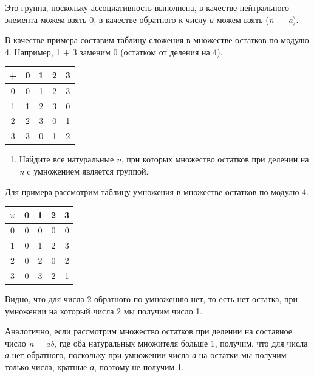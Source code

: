 \documentclass[12pt]{article}
\begin{document}
    Это группа, поскольку ассоциативность выполнена, в качестве нейтрального
    элемента можем взять 0, в качестве обратного к числу \emph{а} можем
    взять (\emph{n --- a}).

    В качестве примера составим таблицу сложения в множестве остатков по
    модулю 4. Например, 1 + 3 заменим 0 (остатком от деления на 4).

    \begin{tabular}{|c|c|c|c|c|}
        \hline
        + & 0 & 1 & 2 & 3 \\
        \hline
        0 & 0 & 1 & 2 & 3 \\
        \hline
        1 & 1 & 2 & 3 & 0 \\
        \hline
        2 & 2 & 3 & 0 & 1 \\
        \hline
        3 & 3 & 0 & 1 & 2 \\
        \hline
    \end{tabular}

    \begin{enumerate}
        \def\labelenumi{\arabic{enumi}.}
        \item
              Найдите все натуральные \emph{n}, при которых множество остатков при
              делении на \emph{n} c умножением является группой.
    \end{enumerate}

    Для примера рассмотрим таблицу умножения в множестве остатков по модулю
    4.

    \begin{tabular}{|c|c|c|c|c|}
        \hline
        $\times$ & 0 & 1 & 2 & 3 \\
        \hline
        0        & 0 & 0 & 0 & 0 \\
        \hline
        1        & 0 & 1 & 2 & 3 \\
        \hline
        2        & 0 & 2 & 0 & 2 \\
        \hline
        3        & 0 & 3 & 2 & 1 \\
        \hline
    \end{tabular}

    Видно, что для числа 2 обратного по умножению нет, то есть нет остатка,
    при умножении на который числа 2 мы получим число 1.

    Аналогично, если рассмотрим множество остатков при делении на составное
    число \emph{n} = \emph{ab}, где оба натуральных множителя больше 1,
    получим, что для числа \emph{а} нет обратного, поскольку при умножении
    числа \emph{а} на остатки мы получим только числа, кратные \emph{а},
    поэтому не получим 1.
\end{document}
